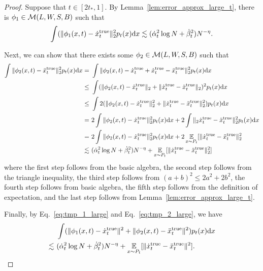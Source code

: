 \begin{proof}
    Suppose that $t \in [2t_*, 1]$.
    By Lemma~\ref{lem:error_approx_large_t}, there is $\phi_1 \in {\cal M}(L,W,S,B)$ such that
    \begin{align}
        \label{eq:tmp_1_large}
        \int (\|\phi_1(x, t) - \dot{x}_t^\mathrm{true}\|_2^2p_t(x)\mathrm{d} x \lesssim  (\dot{\alpha}_t^{2} \log N  +   \dot{\beta}_t^{2} ) N^{-\eta}.
    \end{align}
    
    Next, we can show that there exists some $\phi_2 \in {\cal M}(L,W,S,B)$ such that
    \begin{align}
         \int \|\phi_2(x, t) - \ddot{x}_t^\mathrm{true}\|_2^2 p_t(x) \mathrm{d} x 
         = &~\int \|\phi_2(x, t) - \dot{x}_t^\mathrm{true} +\dot{x}_t^\mathrm{true} - \ddot{x}_t^\mathrm{true}\|_2^2 p_t(x) \mathrm{d} x \notag \\
         \leq &~ \int (\|\phi_2(x, t) - \dot{x}_t^\mathrm{true}\|_2 + \| \dot{x}_t^\mathrm{true}-\ddot{x}_t^\mathrm{true}\|_2)^2 p_t(x) \mathrm{d} x \notag \\
         \leq &~ \int 2(\|\phi_2(x, t) - \dot{x}_t^\mathrm{true}\|_2^2 + \| \dot{x}_t^\mathrm{true}-\ddot{x}_t^\mathrm{true}\|_2^2) p_t(x) \mathrm{d} x \notag \\
         = &~ 2\int \|\phi_2(x, t) - \dot{x}_t^\mathrm{true}\|_2^2 p_t(x) \mathrm{d} x + 2\int \|_2 \dot{x}_t^\mathrm{true}-\ddot{x}_t^\mathrm{true}\|_2^2 p_t(x) \mathrm{d} x \notag \\
         = &~ 2\int \|\phi_2(x, t) - \dot{x}_t^\mathrm{true}\|_2^2p_t(x)\mathrm{d} x + 2\operatorname*{{\mathbb{E}}}_{x \sim P_t}[\|\dot{x}^\mathrm{true}_t - \ddot{x}^\mathrm{true}_t\|_2^2 \notag \\
         \lesssim &~ (\dot{\alpha}_t^{2} \log N  +   \dot{\beta}_t^{2} ) N^{-\eta} + \operatorname*{{\mathbb{E}}}_{x \sim P_t}[\|\dot{x}^\mathrm{true}_t - \ddot{x}^\mathrm{true}_t\|_2^2] \label{eq:tmp_2_large}
    \end{align}
    where the first step follows from the basic algebra, the second step follows from the triangle inequality, the third step follows from $(a+b)^2 \leq 2a^2 + 2b^2$, the fourth step follows from basic algebra, the fifth step follows from the definition of expectation, and the last step follows from Lemma~\ref{lem:error_approx_large_t}.

    Finally, by Eq.~\eqref{eq:tmp_1_large} and Eq.~\eqref{eq:tmp_2_large}, we have
    \begin{align*}
    &~ \int (\|\phi_1(x, t) - \dot{x}_t^\mathrm{true}\|^2 + \|\phi_2(x, t) - \ddot{x}_t^\mathrm{true}\|^2) p_t(x) \mathrm{d} x \\ \lesssim &~ (\dot{\alpha}_t^{2} \log N  +   \dot{\beta}_t^{2} ) N^{-\eta} +
    \operatorname*{{\mathbb{E}}}_{x \sim P_t}[\|\dot{x}^\mathrm{true}_t - \ddot{x}^\mathrm{true}_t\|^2].
    \end{align*}


\end{proof}
